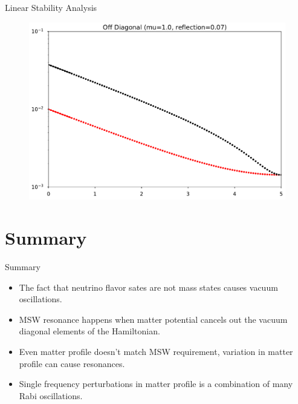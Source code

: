 \documentclass[9pt]{beamer}
\begin{document}
\begin{darkframes}
\begin{frame}{Linear Stability Analysis}
\begin{tcolorbox}

      \begin{figure}
         \includegraphics[width=\textwidth]{assets/halo-mu-1-reflection-0p07}
      \end{figure}


\end{tcolorbox}



\end{frame}






\section{Summary}

\begin{frame}{Summary}



\begin{itemize}\color{ao}
\item
The fact that neutrino flavor sates are not mass states causes vacuum oscillations.
\item
MSW resonance happens when matter potential cancels out the vacuum diagonal elements of the Hamiltonian.
\item
Even matter profile doesn't match MSW requirement, variation in matter profile can cause resonances.
\item
Single frequency perturbations in matter profile is a combination of many Rabi oscillations.
\end{itemize}




\end{frame}
\end{darkframes}
\end{document}
